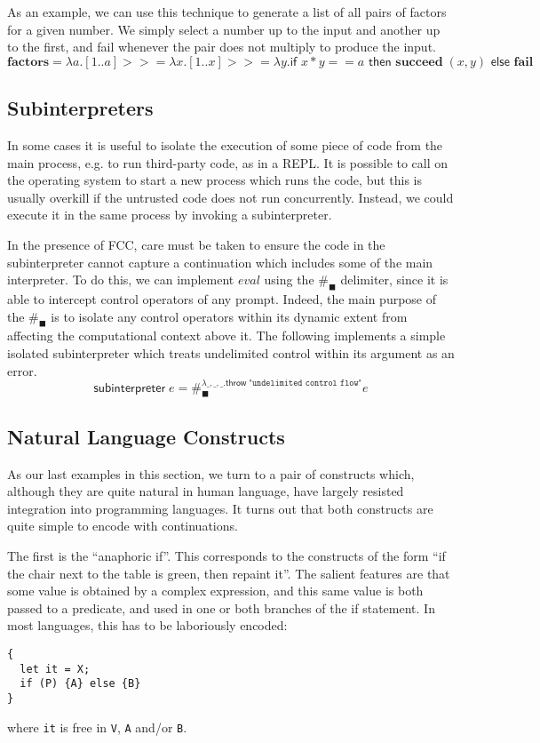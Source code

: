 \documentclass[11pt]{article}
\newcommand{\maybePage}{\newpage}
\newcommand\x{\lambda x}
\begin{document}
As an example, we can use this technique to generate a list of all pairs of factors for a given number.
We simply select a number up to the input and another up to the first, and fail whenever the pair does not multiply to produce the input.
$$\textbf{factors} = \lambda a. [1..a] >\!>= \x.
                             [1..x] >\!>= \lambda y.
                             \textsf{if }x*y == a
                             \textsf{ then }\textbf{succeed}\;(x, y)
                             \textsf{ else }\textbf{fail}$$


\maybePage
\subsection{Subinterpreters}

In some cases it is useful to isolate the execution of some piece of code from the main process, e.g. to run third-party code, as in a REPL.
It is possible to call on the operating system to start a new process which runs the code, but this is usually overkill if the untrusted code does not run concurrently.
Instead, we could execute it in the same process by invoking a subinterpreter.

In the presence of FCC, care must be taken to ensure the code in the subinterpreter cannot capture a continuation which includes some of the main interpreter.
To do this, we can implement $eval$ using the $\#_\blacksquare$ delimiter, since it is able to intercept control operators of any prompt.
Indeed, the main purpose of the $\#_\blacksquare$ is to isolate any control operators within its dynamic extent from affecting the computational context above it.
The following implements a simple isolated subinterpreter which treats undelimited control within its argument as an error.
$$\textsf{subinterpreter}\;e = \#_\blacksquare^{\lambda\_,\_,\_.\textsf{throw}\;\texttt{"undelimited control flow"}}e$$



\maybePage
\subsection{Natural Language Constructs}

As our last examples in this section, we turn to a pair of constructs which, although they are quite natural in human language, have largely resisted integration into programming languages.
It turns out that both constructs are quite simple to encode with continuations.

The first is the ``anaphoric if''.
This corresponds to the constructs of the form ``if the chair next to the table is green, then repaint it''.
The salient features are that some value is obtained by a complex expression, and this same value is both passed to a predicate, and used in one or both branches of the if statement.
In most languages, this has to be laboriously encoded:
\begin{verbatim}
{
  let it = X;
  if (P) {A} else {B}
}
\end{verbatim}
where \texttt{it} is free in \texttt{V}, \texttt{A} and/or \texttt{B}.
\end{document}
